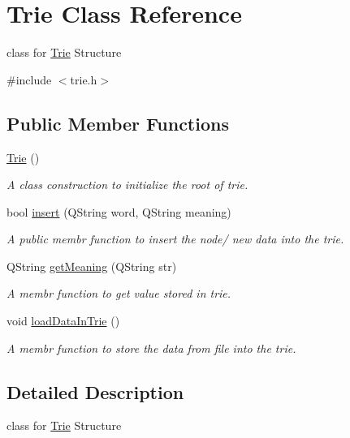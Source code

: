 \hypertarget{classTrie}{}\section{Trie Class Reference}
\label{classTrie}


class for \hyperlink{classTrie}{Trie} Structure  




{\ttfamily \#include $<$trie.\+h$>$}

\subsection*{Public Member Functions}
\begin{DoxyCompactItemize}
\item 
\mbox{\label{classTrie_a6af57e9f25d0d0a2d59eea5a4a802908}} 
\hyperlink{classTrie_a6af57e9f25d0d0a2d59eea5a4a802908}{Trie} ()
\begin{DoxyCompactList}\small\item\em A class construction to initialize the root of trie. \end{DoxyCompactList}\item 
bool \hyperlink{classTrie_a504580e3f2302333ec5f0bbfbb7d72b9}{insert} (Q\+String word, Q\+String meaning)
\begin{DoxyCompactList}\small\item\em A public membr function to insert the node/ new data into the trie. \end{DoxyCompactList}\item 
Q\+String \hyperlink{classTrie_a109938f88ed193f5e269d99d8d1931ca}{get\+Meaning} (Q\+String str)
\begin{DoxyCompactList}\small\item\em A membr function to get value stored in trie. \end{DoxyCompactList}\item 
\mbox{\label{classTrie_a90c8ea2ede015711805332c3b6882e59}} 
void \hyperlink{classTrie_a90c8ea2ede015711805332c3b6882e59}{load\+Data\+In\+Trie} ()
\begin{DoxyCompactList}\small\item\em A membr function to store the data from file into the trie. \end{DoxyCompactList}\end{DoxyCompactItemize}


\subsection{Detailed Description}
class for \hyperlink{classTrie}{Trie} Structure 

